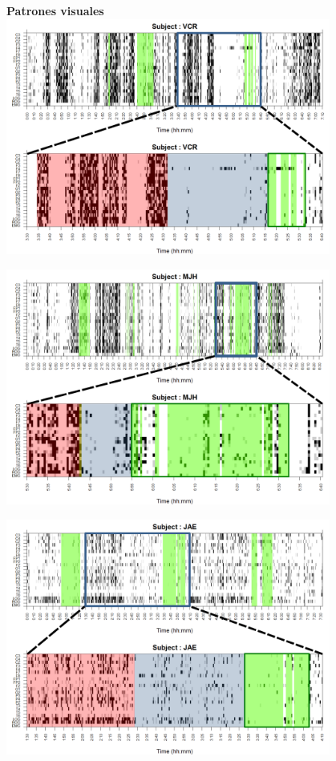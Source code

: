 \begin{figure}
\Large{\textbf{Patrones visuales}}\\
\includegraphics[width=0.95\textwidth]
{./img_ejemplos/zoom_VCR.pdf}
\end{figure}

\begin{figure}
\includegraphics[width=0.95\textwidth]
{./img_ejemplos/zoom_MJH.pdf}
\end{figure}

\begin{figure}
\includegraphics[width=0.95\textwidth]
{./img_ejemplos/zoom_JAE.pdf}
\end{figure}

